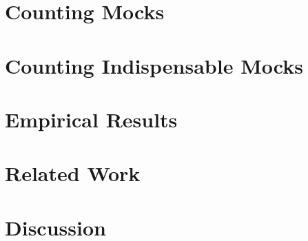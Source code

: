 \documentclass[conference]{IEEEtran}
\begin{document}
\section{Counting Mocks}


\section{Counting Indispensable Mocks}


\section{Empirical Results}


\section{Related Work}


\section{Discussion}




\end{document}
